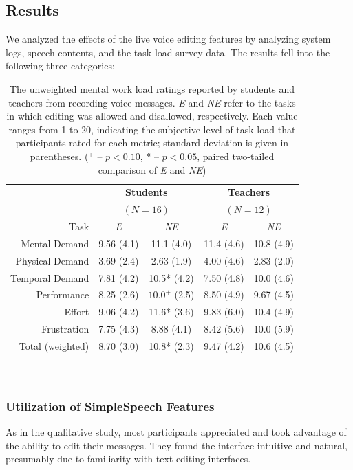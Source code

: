 \subsection{Results}
We analyzed the effects of the live voice editing features by analyzing system logs, speech contents, and the task load survey data. The results fell into the following three categories:

\begin{table}
	\centering
	\begin{tabular}{r c c c c}
		& \multicolumn{2}{c}{\textbf{Students}} & \multicolumn{2}{c}{\textbf{Teachers}}\\
		& \multicolumn{2}{c}{$(N=16)$} & \multicolumn{2}{c}{$(N=12)$}\\
		\toprule
		Task			& \textit{E} & \textit{NE} & \textit{E} & \textit{NE}\\
		Mental Demand   & 9.56 (4.1) & 11.1 (4.0) & 11.4 (4.6) & 10.8 (4.9) \\
		Physical Demand & 3.69 (2.4) & 2.63 (1.9) & 4.00 (4.6) & 2.83 (2.0) \\
		Temporal Demand & 7.81 (4.2) & 10.5* (4.2) & 7.50 (4.8) & 10.0 (4.6) \\
		Performance     & 8.25 (2.6) & $10.0^+$ (2.5) & 8.50 (4.9) & 9.67 (4.5) \\
		Effort          & 9.06 (4.2) & 11.6* (3.6) & 9.83 (6.0) & 10.4 (4.9) \\
		Frustration     & 7.75 (4.3) & 8.88 (4.1) & 8.42 (5.6) & 10.0 (5.9) \\
		\midrule
		Total (weighted)& 8.70 (3.0) & 10.8* (2.3) & 9.47 (4.2) & 10.6 (4.5) \\
		\bottomrule \\
	\end{tabular}
	\caption{The unweighted mental work load ratings reported by students and teachers from recording voice messages. \textit{E} and \textit{NE} refer to the tasks in which editing was allowed and disallowed, respectively. Each value ranges from 1 to 20, indicating the subjective level of task load that participants rated for each metric; standard deviation is given in parentheses. ($^+$ -- $p<0.10$, * -- $p<0.05$, paired two-tailed comparison of \textit{E} and \textit{NE})}~\label{tab:table1}
\end{table}

\subsubsection{Utilization of SimpleSpeech Features}
As in the qualitative study, most participants appreciated and took advantage of the ability to edit their messages. They found the interface intuitive and natural, presumably due to familiarity with text-editing interfaces. 

